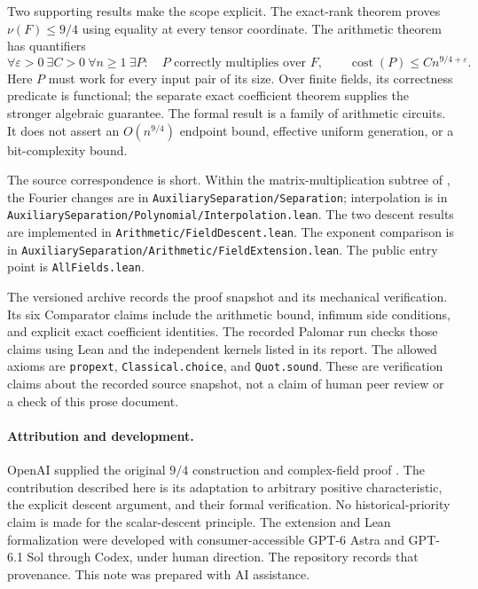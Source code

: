 \documentclass[11pt]{article}
\theoremstyle{remark}
\newcommand{\eps}{\varepsilon}
\numberwithin{equation}{section}
\begin{document}
Two supporting results make the scope explicit. The exact-rank theorem
proves $\nu(F)\leq9/4$ using equality at every tensor coordinate.
The arithmetic theorem has quantifiers
\[
\forall\eps>0\ \exists C>0\ \forall n\geq1\ \exists P:
\quad P\text{ correctly multiplies over }F,\qquad
\operatorname{cost}(P)\leq Cn^{9/4+\eps}.
\]
Here $P$ must work for every input pair of its size. Over finite
fields, its correctness predicate is functional; the separate exact
coefficient theorem supplies the stronger algebraic guarantee.
The formal result is a family of arithmetic circuits. It does not
assert an $O(n^{9/4})$ endpoint bound, effective uniform generation,
or a bit-complexity bound.

\begin{flushleft}
\small
The source correspondence is short. Within the matrix-multiplication
subtree of \cite{Formalization}, the Fourier changes are in
\nolinkurl{AuxiliarySeparation/Separation}; interpolation is in
\nolinkurl{AuxiliarySeparation/Polynomial/Interpolation.lean}.
The two descent results are implemented in
\nolinkurl{Arithmetic/FieldDescent.lean}. The exponent comparison is in
\nolinkurl{AuxiliarySeparation/Arithmetic/FieldExtension.lean}.
The public entry point is \nolinkurl{AllFields.lean}.
\end{flushleft}

The versioned archive records the proof snapshot and its mechanical
verification. Its six Comparator claims include the arithmetic bound,
infimum side conditions, and explicit exact coefficient identities.
The recorded Palomar run checks those claims using Lean and the
independent kernels listed in its report. The allowed axioms are
\texttt{propext}, \texttt{Classical.choice}, and \texttt{Quot.sound}.
These are verification claims about the recorded source snapshot,
not a claim of human peer review or a check of this prose document.

\paragraph{Attribution and development.}
OpenAI supplied the original $9/4$ construction and complex-field proof
\cite{OAI,OAILean}. The contribution described here is its adaptation
to arbitrary positive characteristic, the explicit descent argument,
and their formal verification. No historical-priority claim is made
for the scalar-descent principle. The extension and Lean formalization
were developed with consumer-accessible GPT-6 Astra and GPT-6.1 Sol
through Codex, under human direction. The repository records that
provenance. This note was prepared with AI assistance.
\end{document}
